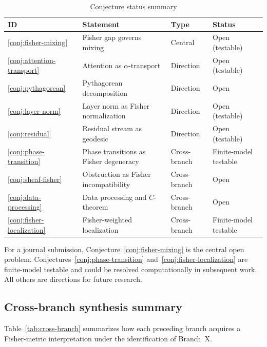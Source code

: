 \documentclass[11pt]{article}
\theoremstyle{remark}
\begin{document}
\begin{table}[htbp]
\centering
\caption{Conjecture status summary}
\label{tab:conjectures}
\begin{tabular}{@{}llll@{}}
\toprule
\textbf{ID} & \textbf{Statement} & \textbf{Type} & \textbf{Status} \\
\midrule
\ref{conj:fisher-mixing} & Fisher gap governs mixing &
Central & Open (testable) \\
\ref{conj:attention-transport} & Attention as $\alpha$-transport &
Direction & Open (testable) \\
\ref{conj:pythagorean} & Pythagorean decomposition &
Direction & Open \\
\ref{conj:layer-norm} & Layer norm as Fisher normalization &
Direction & Open (testable) \\
\ref{conj:residual} & Residual stream as geodesic &
Direction & Open (testable) \\
\ref{conj:phase-transition} & Phase transitions as Fisher degeneracy &
Cross-branch & Finite-model testable \\
\ref{conj:sheaf-fisher} & Obstruction as Fisher incompatibility &
Cross-branch & Open \\
\ref{conj:data-processing} & Data processing and $C$-theorem &
Cross-branch & Open \\
\ref{conj:fisher-localization} & Fisher-weighted localization &
Cross-branch & Finite-model testable \\
\bottomrule
\end{tabular}
\end{table}

For a journal submission, Conjecture~\ref{conj:fisher-mixing} is the central
open problem.  Conjectures~\ref{conj:phase-transition}
and~\ref{conj:fisher-localization} are finite-model testable and could be
resolved computationally in subsequent work.  All others are directions for
future research.

\subsection{Cross-branch synthesis summary}

Table~\ref{tab:cross-branch} summarizes how each preceding branch acquires a
Fisher-metric interpretation under the identification of Branch~X.
\end{document}
